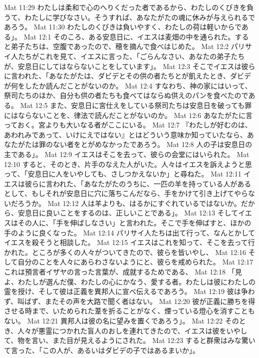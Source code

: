 Mat 11:29  わたしは柔和で心のへりくだった者であるから、わたしのくびきを負うて、わたしに学びなさい。そうすれば、あなたがたの魂に休みが与えられるであろう。
Mat 11:30  わたしのくびきは負いやすく、わたしの荷は軽いからである」。
Mat 12:1  そのころ、ある安息日に、イエスは麦畑の中を通られた。すると弟子たちは、空腹であったので、穂を摘んで食べはじめた。
Mat 12:2  パリサイ人たちがこれを見て、イエスに言った、「ごらんなさい、あなたの弟子たちが、安息日にしてはならないことをしています」。
Mat 12:3  そこでイエスは彼らに言われた、「あなたがたは、ダビデとその供の者たちとが飢えたとき、ダビデが何をしたか読んだことがないのか。
Mat 12:4  すなわち、神の家にはいって、祭司たちのほか、自分も供の者たちも食べてはならぬ供えのパンを食べたのである。
Mat 12:5  また、安息日に宮仕えをしている祭司たちは安息日を破っても罪にはならないことを、律法で読んだことがないのか。
Mat 12:6  あなたがたに言っておく。宮よりも大いなる者がここにいる。
Mat 12:7  『わたしが好むのは、あわれみであって、いけにえではない』とはどういう意味か知っていたなら、あなたがたは罪のない者をとがめなかったであろう。
Mat 12:8  人の子は安息日の主である」。
Mat 12:9  イエスはそこを去って、彼らの会堂にはいられた。
Mat 12:10  すると、そのとき、片手のなえた人がいた。人々はイエスを訴えようと思って、「安息日に人をいやしても、さしつかえないか」と尋ねた。
Mat 12:11  イエスは彼らに言われた、「あなたがたのうちに、一匹の羊を持っている人があるとして、もしそれが安息日に穴に落ちこんだなら、手をかけて引き上げてやらないだろうか。
Mat 12:12  人は羊よりも、はるかにすぐれているではないか。だから、安息日に良いことをするのは、正しいことである」。
Mat 12:13  そしてイエスはその人に、「手を伸ばしなさい」と言われた。そこで手を伸ばすと、ほかの手のように良くなった。
Mat 12:14  パリサイ人たちは出て行って、なんとかしてイエスを殺そうと相談した。
Mat 12:15  イエスはこれを知って、そこを去って行かれた。ところが多くの人々がついてきたので、彼らを皆いやし、
Mat 12:16  そして自分のことを人々にあらわさないようにと、彼らを戒められた。
Mat 12:17  これは預言者イザヤの言った言葉が、成就するためである、
Mat 12:18  「見よ、わたしが選んだ僕、わたしの心にかなう、愛する者。わたしは彼にわたしの霊を授け、そして彼は正義を異邦人に宣べ伝えるであろう。
Mat 12:19  彼は争わず、叫ばず、またその声を大路で聞く者はない。
Mat 12:20  彼が正義に勝ちを得させる時まで、いためられた葦を折ることがなく、煙っている燈心を消すこともない。
Mat 12:21  異邦人は彼の名に望みを置くであろう」。
Mat 12:22  そのとき、人々が悪霊につかれた盲人のおしを連れてきたので、イエスは彼をいやして、物を言い、また目が見えるようにされた。
Mat 12:23  すると群衆はみな驚いて言った、「この人が、あるいはダビデの子ではあるまいか」。
